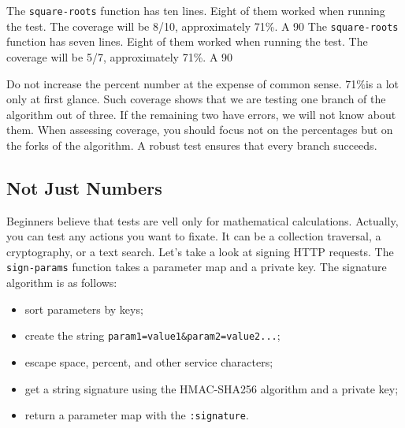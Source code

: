 \ifnarrow

\def\covperc{80\%}

\else

\def\covperc{71\%}

\fi

\ifnarrow
The \verb|square-roots| function has ten lines. Eight of them worked when running the test. The coverage will be 8/10, approximately \covperc. A 90%
\else
The \verb|square-roots| function has seven lines. Eight of them worked when running the test. The coverage will be 5/7, approximately \covperc. A 90%
\fi

Do not increase the percent number at the expense of common sense. \covperc is a lot only at first glance. Such coverage shows that we are testing one branch of the algorithm out of three. If the remaining two have errors, we will not know about them. When assessing coverage, you should focus not on the percentages but on the forks of the algorithm. A robust test ensures that every branch succeeds.

\subsection{Not Just Numbers}

Beginners believe that tests are vell only for mathematical calculations. Actually, you can test any actions you want to fixate. It can be a collection traversal, a cryptography, or a text search.
Let's take a look at signing HTTP requests. The \verb|sign-params| function takes a parameter map and a private key. The signature algorithm is as follows:

\begin{itemize}


\item
  sort parameters by keys;

\item
  create the string \texttt{param1=value1\&param2\-=va\-lue2...};

\item
  escape space, percent, and other service characters;

\item
  get a string signature using the HMAC-SHA256 algorithm and a private key;

\item
  return a parameter map with the \texttt{:sig\-na\-tu\-re}.

\end{itemize}

